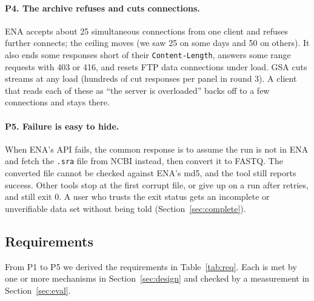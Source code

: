 \documentclass[11pt,a4paper]{article}
\newcommand{\code}[1]{\texttt{#1}}
\newcommand{\tabref}[1]{Table~\ref{#1}}
\newcommand{\secref}[1]{Section~\ref{#1}}
\begin{document}
\paragraph{P4. The archive refuses and cuts connections.} ENA accepts about 25 simultaneous connections from one
client and refuses further connects; the ceiling moves (we saw 25 on some days and 50 on others). It also ends some
responses short of their \code{Content-Length}, answers some range requests with 403 or 416, and resets FTP data
connections under load. GSA cuts streams at any load (hundreds of cut responses per panel in round 3). A client that
reads each of these as ``the server is overloaded'' backs off to a few connections and stays there.

\paragraph{P5. Failure is easy to hide.} When ENA's API fails, the common response is to assume the run is not in ENA
and fetch the \code{.sra} file from NCBI instead, then convert it to FASTQ. The converted file cannot be checked
against ENA's md5, and the tool still reports success. Other tools stop at the first corrupt file, or give up on a run
after retries, and still exit 0. A user who trusts the exit status gets an incomplete or unverifiable data set
without being told (\secref{sec:complete}).

\subsection{Requirements}
\label{sec:req}
From P1 to P5 we derived the requirements in \tabref{tab:req}. Each is met by one or more mechanisms in
\secref{sec:design} and checked by a measurement in \secref{sec:eval}.
\end{document}
